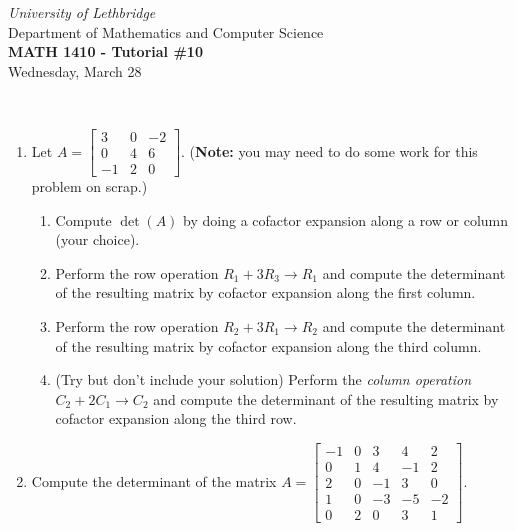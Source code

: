 \documentclass[12pt]{article}
\newcommand{\skipline}{\vspace{12pt}}
\newcommand{\bbm}{\begin{bmatrix}}
\newcommand{\ebm}{\end{bmatrix}}
\begin{document}
\author{Instructor: Sean Fitzpatrick}
\thispagestyle{empty}
\begin{center}
\emph{University of Lethbridge}\\
Department of Mathematics and Computer Science\\
{\bf MATH 1410 - Tutorial \#10}\\
Wednesday, March 28
\end{center}
\skipline \ \noindent \skipline

\vspace*{\fill}









\newpage

 \begin{enumerate}
\item Let $A=\bbm 3&0&-2\\0&4&6\\-1&2&0\ebm$. (\textbf{Note:} you may need to do some work for this problem on scrap.)
\begin{enumerate}
\item Compute $\det(A)$ by doing a cofactor expansion along a row or column (your choice).

\vspace{2in}

\item Perform the row operation $R_1+3R_3\to R_1$ and compute the determinant of the resulting matrix by cofactor expansion along the first column.

\vspace{2in}

\item Perform the row operation $R_2+3R_1\to R_2$ and compute the determinant of the resulting matrix by cofactor expansion along the third column.

\vspace{2in}

\item (Try but don't include your solution) Perform the \textit{column operation} $C_2+2C_1\to C_2$ and compute the determinant of the resulting matrix by cofactor expansion along the third row.
\end{enumerate}
\newpage

\item Compute the determinant of the matrix $A=\bbm -1&0&3&4&2\\0&1&4&-1&2\\2&0&-1&3&0\\1&0&-3&-5&-2\\0&2&0&3&1\ebm$.


\end{enumerate}
\end{document}
